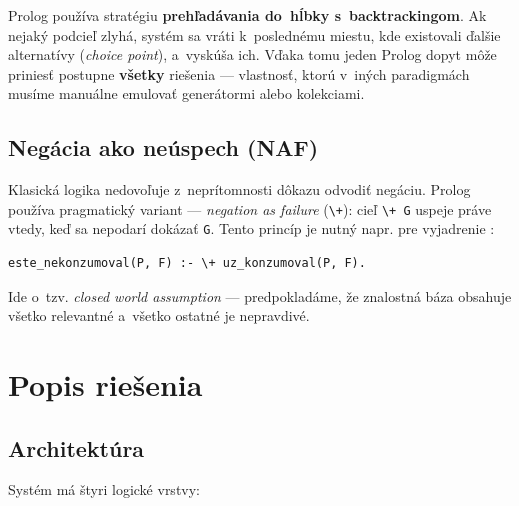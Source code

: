 \documentclass[11pt,a4paper]{article}
\begin{document}
Prolog používa stratégiu \textbf{prehľadávania do~hĺbky
s~backtrackingom}. Ak nejaký podcieľ zlyhá, systém sa vráti
k~poslednému miestu, kde existovali ďalšie alternatívy
(\emph{choice point}), a~vyskúša ich. Vďaka tomu jeden Prolog
dopyt môže priniesť postupne \textbf{všetky} riešenia ---
vlastnosť, ktorú v~iných paradigmách musíme manuálne emulovať
generátormi alebo kolekciami.

\subsection{Negácia ako neúspech (NAF)}

Klasická logika nedovoľuje z~neprítomnosti dôkazu odvodiť
negáciu. Prolog používa pragmatický variant ---
\emph{negation as failure} (\texttt{\textbackslash+}): cieľ
\texttt{\textbackslash+ G} uspeje práve vtedy, keď sa nepodarí
dokázať \texttt{G}. Tento princíp je nutný napr. pre vyjadrenie
:

\begin{lstlisting}[numbers=none]
este_nekonzumoval(P, F) :- \+ uz_konzumoval(P, F).
\end{lstlisting}

\noindent Ide o~tzv. \emph{closed world assumption} ---
predpokladáme, že znalostná báza obsahuje všetko relevantné
a~všetko ostatné je nepravdivé.

\section{Popis riešenia}

\subsection{Architektúra}

Systém má štyri logické vrstvy:
\end{document}
